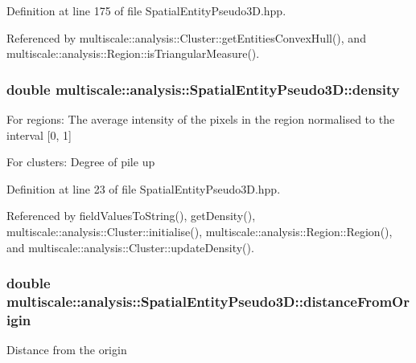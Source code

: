 \-Definition at line 175 of file \-Spatial\-Entity\-Pseudo3\-D.\-hpp.



\-Referenced by multiscale\-::analysis\-::\-Cluster\-::get\-Entities\-Convex\-Hull(), and multiscale\-::analysis\-::\-Region\-::is\-Triangular\-Measure().

\hypertarget{classmultiscale_1_1analysis_1_1SpatialEntityPseudo3D_aedf807816f8c2f7cd961acfe0042fc56}{
\subsubsection[{density}]{\setlength{\rightskip}{0pt plus 5cm}double {\bf multiscale\-::analysis\-::\-Spatial\-Entity\-Pseudo3\-D\-::density}}}\label{classmultiscale_1_1analysis_1_1SpatialEntityPseudo3D_aedf807816f8c2f7cd961acfe0042fc56}
\-For regions\-: \-The average intensity of the pixels in the region normalised to the interval \mbox{[}0, 1\mbox{]}

\-For clusters\-: \-Degree of pile up 

\-Definition at line 23 of file \-Spatial\-Entity\-Pseudo3\-D.\-hpp.



\-Referenced by field\-Values\-To\-String(), get\-Density(), multiscale\-::analysis\-::\-Cluster\-::initialise(), multiscale\-::analysis\-::\-Region\-::\-Region(), and multiscale\-::analysis\-::\-Cluster\-::update\-Density().

\hypertarget{classmultiscale_1_1analysis_1_1SpatialEntityPseudo3D_a056f67b90ed41c0e6dc4df31b71ad906}{
\subsubsection[{distance\-From\-Origin}]{\setlength{\rightskip}{0pt plus 5cm}double {\bf multiscale\-::analysis\-::\-Spatial\-Entity\-Pseudo3\-D\-::distance\-From\-Origin}}}\label{classmultiscale_1_1analysis_1_1SpatialEntityPseudo3D_a056f67b90ed41c0e6dc4df31b71ad906}
\-Distance from the origin 

